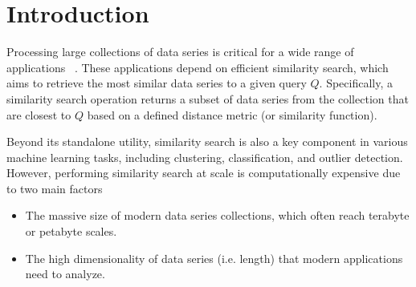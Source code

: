 \documentclass[a4paper,11pt,twoside,openany]{book}
\begin{document}
 \pagestyle{headings}
\chapter{Introduction}
\label{chapter:introduction}


Processing large collections of data series is critical for a wide range of applications
~\cite{DBLP:journals/sigmod/Palpanas15,DBLP:journals/dagstuhl-reports/BagnallCPZ19,Palpanas2019}.
These applications depend on efficient similarity search, which aims to retrieve the most similar
data series to a given query $Q$.
Specifically, a similarity search operation returns a subset of data series from the collection 
that are closest to $Q$  based on a defined distance metric (or similarity function).

Beyond its standalone utility, similarity search is also a key component in various machine 
learning tasks, including clustering, classification, and outlier detection. However, 
performing similarity search at scale is computationally expensive due to two main factors 
\begin{itemize}
\item The massive size of modern data series collections, which often reach terabyte or petabyte scales.
\item The high dimensionality of data series (i.e. length) that modern applications need to analyze.
\end{itemize}
\end{document}
